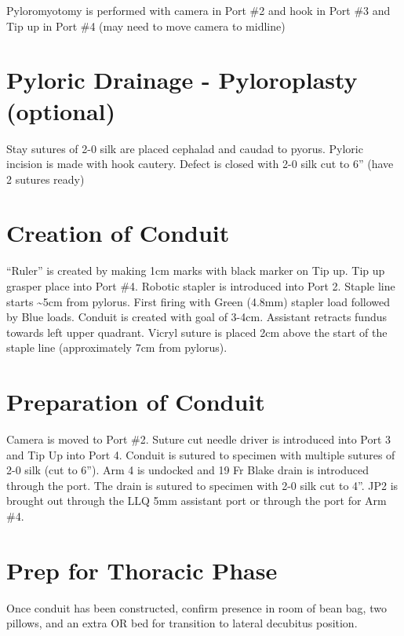 \documentclass[
  letterpaper,
]{scrbook}
\begin{document}
Pyloromyotomy is performed with camera in Port \#2 and hook in Port \#3
and Tip up in Port \#4 (may need to move camera to midline)

\section{Pyloric Drainage - Pyloroplasty
(optional)}\label{pyloric-drainage---pyloroplasty-optional}

Stay sutures of 2-0 silk are placed cephalad and caudad to pyorus.
Pyloric incision is made with hook cautery. Defect is closed with 2-0
silk cut to 6'' (have 2 sutures ready)

\section{Creation of Conduit}\label{creation-of-conduit}

``Ruler'' is created by making 1cm marks with black marker on Tip up.
Tip up grasper place into Port \#4. Robotic stapler is introduced into
Port 2. Staple line starts \textasciitilde5cm from pylorus. First firing
with Green (4.8mm) stapler load followed by Blue loads. Conduit is
created with goal of 3-4cm. Assistant retracts fundus towards left upper
quadrant. Vicryl suture is placed 2cm above the start of the staple line
(approximately 7cm from pylorus).

\section{Preparation of Conduit}\label{preparation-of-conduit}

Camera is moved to Port \#2. Suture cut needle driver is introduced into
Port 3 and Tip Up into Port 4. Conduit is sutured to specimen with
multiple sutures of 2-0 silk (cut to 6''). Arm 4 is undocked and 19 Fr
Blake drain is introduced through the port. The drain is sutured to
specimen with 2-0 silk cut to 4''. JP2 is brought out through the LLQ
5mm assistant port or through the port for Arm \#4.

\section{Prep for Thoracic Phase}\label{prep-for-thoracic-phase}

Once conduit has been constructed, confirm presence in room of bean bag,
two pillows, and an extra OR bed for transition to lateral decubitus
position.
\end{document}
